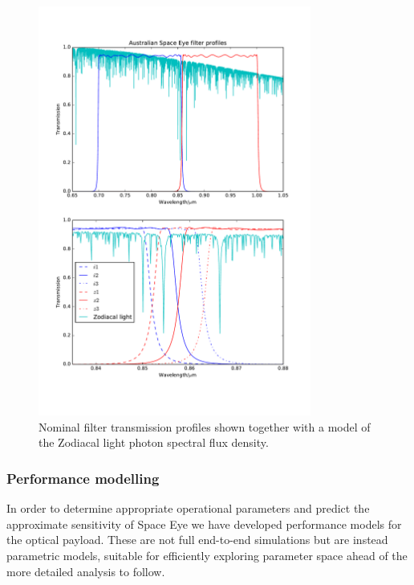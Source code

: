 \documentclass[]{iac}
\begin{document}
\begin{figure}[pt]
  \center \includegraphics[width=0.8\textwidth]{figures/filters.pdf}
  \caption{\label{fig:filters}Nominal filter transmission profiles shown together with a model of the Zodiacal light
    photon spectral flux density.}
\end{figure}

\subsubsection{Performance modelling} \label{sec:perf}

In order to determine appropriate operational parameters and predict the approximate sensitivity of Space Eye we have
developed performance models for the optical payload. These are not full end-to-end simulations but are instead
parametric models, suitable for efficiently exploring parameter space ahead of the more detailed analysis to follow.
\end{document}
